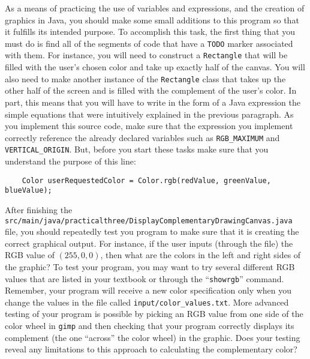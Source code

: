 \documentclass[11pt]{article}
\newcommand{\mainprogramsource}{\lstinline{src/main/java/practicalthree/DisplayComplementaryDrawingCanvas.java}}
\newcommand{\command}[1]{``\lstinline{#1}''}
\newcommand{\program}[1]{\lstinline{#1}}
\begin{document}
As a means of practicing the use of variables and expressions, and the creation
of graphics in Java, you should make some small additions to this program so
that it fulfills its intended purpose. To accomplish this task, the first thing
that you must do is find all of the segments of code that have a \program{TODO}
marker associated with them. For instance, you will need to construct a
\program{Rectangle} that will be filled with the user's chosen color and take up
exactly half of the canvas. You will also need to make another instance of the
\program{Rectangle} class that takes up the other half of the screen and is
filled with the complement of the user's color. In part, this means that you
will have to write in the form of a Java expression the simple equations that
were intuitively explained in the previous paragraph. As you implement this
source code, make sure that the expression you implement correctly reference the
already declared variables such as \program{RGB_MAXIMUM} and
\program{VERTICAL_ORIGIN}. But, before you start these tasks make sure that you
understand the purpose of this line:

\begin{verbatim}
    Color userRequestedColor = Color.rgb(redValue, greenValue, blueValue);
\end{verbatim}



After finishing the \mainprogramsource{} file, you should repeatedly test you
program to make sure that it is creating the correct graphical output. For
instance, if the user inputs (through the file) the RGB value of $(255, 0, 0)$,
then what are the colors in the left and right sides of the graphic? To test
your program, you may want to try several different RGB values that are listed
in your textbook or through the \command{showrgb} command. Remember, your
program will receive a new color specification only when you change the values
in the file called \program{input/color_values.txt}. More advanced testing of
your program is possible by picking an RGB value from one side of the color
wheel in {\tt gimp} and then checking that your program correctly displays its
complement (the one ``across'' the color wheel) in the graphic. Does your
testing reveal any limitations to this approach to calculating the complementary
color?
\end{document}
